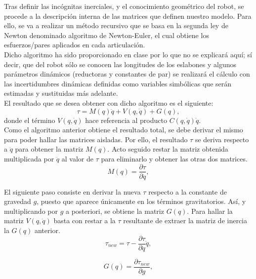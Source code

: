 \newpage

Tras definir las incógnitas inerciales, y el conocimiento geométrico del robot, se procede a la descripción interna de las
 matrices que definen nuestro modelo. Para ello, se va a realizar un método recursivo que se basa en la segunda ley de
 Newton denominado algoritmo de Newton-Euler, el cual obtiene los esfuerzos/pares aplicados en cada articulación.\\
 Dicho algoritmo ha sido proporcionado en clase por lo que no se explicará aquí; sí decir, que del robot sólo se conocen
 las longitudes de los eslabones y algunos parámetros dinámicos (reductoras y constantes de par) se realizará el cálculo 
 con las incertidumbres dinámicas definidas como variables simbólicas que serán estimadas y sustituidas más adelante.\\

El resultado que se desea obtener con dicho algoritmo es el siguiente:\\
\begin{equation}
\tau=M(q)\ddot{q}+V(q,\dot{q})+G(q),
\end{equation}
donde el término $V(q,\dot{q})$ hace referencia al producto $C(q,\dot{q})\dot{q}$.\\

Como el algoritmo anterior obtiene el resultado total, se debe derivar el mismo para poder hallar las matrices aisladas. Por ello, el resultado $\tau$ se deriva respecto a $\ddot{q}$ para obtener la matriz $M(q)$. Acto seguido restar la matriz obtenida multiplicada por $\ddot{q}$ al valor de $\tau$ para eliminarlo y obtener las otras dos matrices.\\
\begin{equation}
M(q)=\dfrac{\partial{\tau}}{\partial{\ddot{q}}},
\end{equation}

El siguiente paso consiste en derivar la nueva $\tau$ respecto a la constante de gravedad $g$, puesto que aparece únicamente en los términos gravitatorios. Así, y multiplicando por $g$ a posteriori, se obtiene la matriz $G(q)$. Para hallar la matriz $V(q,\dot{q})$ basta con restar a la $\tau$ resultante de extraer la matriz de inercia la $G(q)$ anterior.\\
\begin{equation}
\tau_{new}=\tau-\dfrac{\partial{\tau}}{\partial{\ddot{q}}}\ddot{q},
\end{equation}

\begin{equation}
G(q)=\dfrac{\partial{\tau_{new}}}{\partial{g}},
\end{equation}

